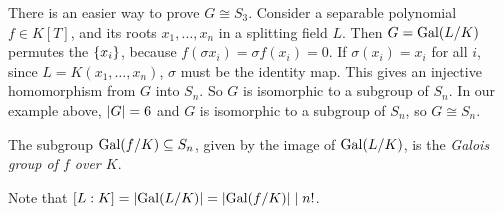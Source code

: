 There is an easier way to prove \( G \cong S_3 \).
Consider a separable polynomial \( f \in K[T] \), and its roots \( x_1, \dots, x_n \) in a splitting field \( L \).
Then \( G = \operatorname{Gal}(L / K) \) permutes the \( \qty{x_i} \), because \( f(\sigma x_i) = \sigma f(x_i) = 0 \).
If \( \sigma(x_i) = x_i \) for all \( i \), since \( L = K(x_1, \dots, x_n) \), \( \sigma \) must be the identity map.
This gives an injective homomorphism from \( G \) into \( S_n \).
So \( G \) is isomorphic to a subgroup of \( S_n \).
In our example above, \( \abs{G} = 6 \) and \( G \) is isomorphic to a subgroup of \( S_n \), so \( G \cong S_n \).
\begin{definition}
	The subgroup \( \operatorname{Gal}(f/K) \subseteq S_n \), given by the image of \( \operatorname{Gal}(L/K) \), is the \emph{Galois group of \( f \) over \( K \)}.
\end{definition}
\begin{remark}
	Note that \( [L : K] = \abs{\operatorname{Gal}(L/K)} = \abs{\operatorname{Gal}(f/K)} \mid n! \).
\end{remark}

